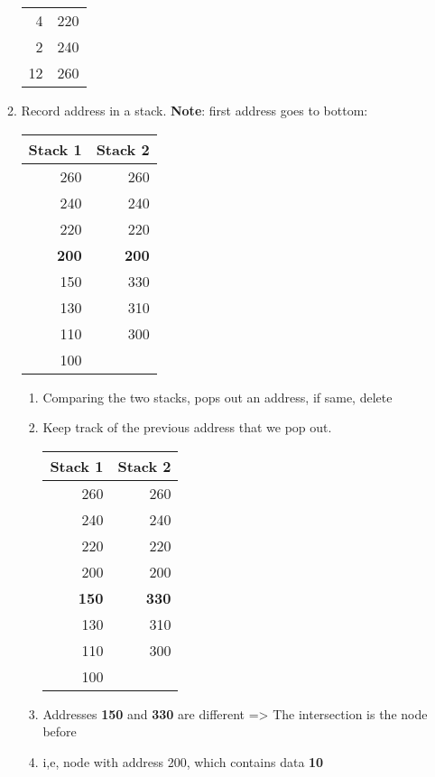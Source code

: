 \documentclass[11pt]{article}
\begin{document}
\begin{enumerate}
\begin{enumerate}
\begin{center}
\begin{tabular}{rr}
4 & 220\\
2 & 240\\
12 & 260\\
\end{tabular}
\end{center}
\item Record address in a stack. \textbf{Note}: first address goes to bottom:
\label{sec:org625d9af}
\begin{center}
\begin{tabular}{rr}
Stack 1 & Stack 2\\
\hline
260 & 260\\
240 & 240\\
220 & 220\\
\textbf{200} & \textbf{200}\\
150 & 330\\
130 & 310\\
110 & 300\\
100 & \\
\end{tabular}
\end{center}
\begin{enumerate}
\item Comparing the two stacks, pops out an address, if same, delete
\label{sec:org18327d5}
\item Keep track of the previous address that we pop out.
\label{sec:orge74f13c}
\begin{center}
\begin{tabular}{rr}
Stack 1 & Stack 2\\
\hline
260 & 260\\
240 & 240\\
220 & 220\\
200 & 200\\
\textbf{150} & \textbf{330}\\
130 & 310\\
110 & 300\\
100 & \\
\end{tabular}
\end{center}
\item Addresses \textbf{150} and \textbf{330} are different => The intersection is the node before
\label{sec:org859a04f}
\item i,e, node with address 200, which contains data \textbf{10}
\label{sec:orgae1a587}
\end{enumerate}
\end{enumerate}
\end{enumerate}
\end{document}
